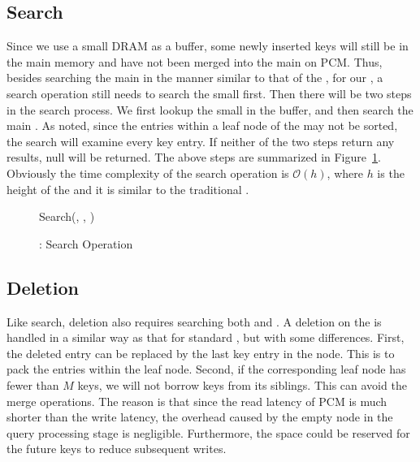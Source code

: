 \subsection{Search}\label{sec:model:update:search}

Since we use a small DRAM as a buffer, some
newly inserted keys will still be in the main memory \bplustree and
have not been merged into the main \bptree on PCM.
Thus, besides searching the main \bptree in the manner similar to that of the \bplustree, for our \bptree, a search operation still needs to search the small \bplustree first. Then there will be two steps in the search process.
We first lookup the small \bplustree in the buffer, and then search the main \bptree. As noted, since the entries within a leaf node of the \bptree may not
be sorted, the search will examine every key entry.
If neither of the two steps return any results, \textsf{null} will be returned. The above steps are summarized in Figure~\ref{alg:search}.
Obviously the time complexity of the search operation is $\mathcal{O}(h)$, where $h$ is the height of the \bptree and it is similar to the traditional \bplustree.


\begin{figure}[!t]
\linesnumbered \SetVline \setcounter{algocf}{1}
\begin{algorithm}[H]
\caption{Search(\bplustree, \bptree, \key{})}
\label{alg:alg3}
\end{algorithm}
\caption{\bptree: Search Operation}\label{alg:search}
\end{figure}

\subsection{Deletion}\label{sec:model:update:deletion}

Like search, deletion also requires searching both \bptree and \bplustree.
A deletion on the \bptree is handled in a similar way as that for
standard \bplustree, but with some differences.
First, the deleted entry can be replaced by the last key entry in the
node. This is to pack the entries within the leaf node.
Second,
if the corresponding leaf node has fewer than $M$ keys, we will not borrow keys from its siblings. This can avoid the merge operations. The reason is that since the read latency of PCM is much shorter than the
write latency, the overhead caused by the empty node in the query processing stage is negligible. Furthermore, the space could be reserved for the future keys to reduce subsequent writes.



